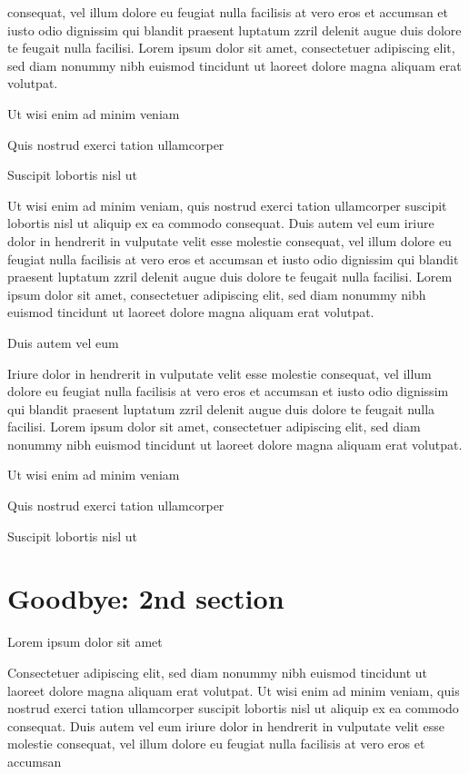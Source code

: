 \documentclass[11pt]{article}\makeatletter
\makeatletter
\renewcommand\section{\@startsection {section}{1}{\z@}%
     {-1.75ex \@plus -0.5ex \@minus -.2ex}%
     {0.5ex \@plus .2ex}%
     {\reset@font\Large\bfseries\sffamily}}
\def\DivI{\section}
\def\DivI{\chapter}
\makeatother
\begin{document}
      consequat, vel illum dolore eu feugiat nulla facilisis at vero eros et
      accumsan et iusto odio dignissim qui blandit praesent luptatum zzril
      delenit augue duis dolore te feugait nulla facilisi. Lorem ipsum dolor
      sit amet, consectetuer adipiscing elit, sed diam nonummy nibh euismod
      tincidunt ut laoreet dolore magna aliquam erat volutpat. \par Ut wisi enim ad minim veniam\par Quis nostrud exerci tation ullamcorper \par Suscipit lobortis nisl ut \par Ut wisi enim ad minim veniam, quis nostrud exerci tation
      ullamcorper suscipit lobortis nisl ut aliquip ex ea commodo
      consequat. Duis autem vel eum iriure dolor in hendrerit in vulputate
      velit esse molestie consequat, vel illum dolore eu feugiat nulla
      facilisis at vero eros et accumsan et iusto odio dignissim qui blandit
      praesent luptatum zzril delenit augue duis dolore te feugait nulla
      facilisi. Lorem ipsum dolor sit amet, consectetuer adipiscing elit,
      sed diam nonummy nibh euismod tincidunt ut laoreet dolore magna
      aliquam erat volutpat. \par Duis autem vel eum \par Iriure dolor in hendrerit in vulputate velit esse molestie
      consequat, vel illum dolore eu feugiat nulla facilisis at vero eros et
      accumsan et iusto odio dignissim qui blandit praesent luptatum zzril
      delenit augue duis dolore te feugait nulla facilisi. Lorem ipsum dolor
      sit amet, consectetuer adipiscing elit, sed diam nonummy nibh euismod
      tincidunt ut laoreet dolore magna aliquam erat volutpat. \par Ut wisi enim ad minim veniam\par Quis nostrud exerci tation ullamcorper \par Suscipit lobortis nisl ut 
\DivI[Goodbye: 2nd section]{Goodbye: 2nd section}\label{part2}\par Lorem ipsum dolor sit amet\par Consectetuer adipiscing elit, sed diam nonummy nibh euismod
      tincidunt ut laoreet dolore magna aliquam erat volutpat. Ut wisi enim
      ad minim veniam, quis nostrud exerci tation ullamcorper suscipit
      lobortis nisl ut aliquip ex ea commodo consequat. Duis autem vel eum
      iriure dolor in hendrerit in vulputate velit esse molestie consequat,
      vel illum dolore eu feugiat nulla facilisis at vero eros et accumsan
\end{document}
